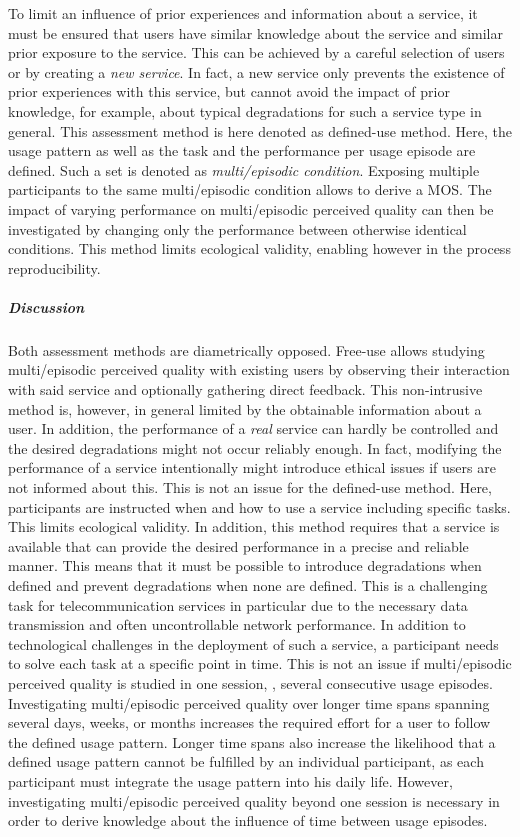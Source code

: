 To limit an influence of prior experiences and information about a service, it must be ensured that users have similar knowledge about the service and similar prior exposure to the service.
This can be achieved by a careful selection of users or by creating a \emph{new service}.
In fact, a new service only prevents the existence of prior experiences with this service, but cannot avoid the impact of prior knowledge, for example, about typical degradations for such a service type in general.
This assessment method is here denoted as defined-use method.
Here, the usage pattern as well as the task and the performance per usage episode are defined.
Such a set is denoted as \emph{multi\-/episodic condition}.
Exposing multiple participants to the same multi\-/episodic condition allows to derive a \ac{MOS}.
The impact of varying performance on multi\-/episodic perceived quality can then be investigated by changing only the performance between otherwise identical conditions.
This method limits ecological validity, enabling however in the process reproducibility.

\subparagraph*{Discussion}
Both assessment methods are diametrically opposed. 
Free-use allows studying multi\-/episodic perceived quality with existing users by observing their interaction with said service and optionally gathering direct feedback.
This non-intrusive method is, however, in general limited by the obtainable information about a user.
In addition, the performance of a \emph{real} service can hardly be controlled and the desired degradations might not occur reliably enough.
In fact, modifying the performance of a service intentionally might introduce ethical issues if users are not informed about this.
This is not an issue for the defined-use method.
Here, participants are instructed when and how to use a service including specific tasks.
This limits ecological validity.
In addition, this method requires that a service is available that can provide the desired performance in a precise and reliable manner.
This means that it must be possible to introduce degradations when defined and prevent degradations when none are defined.
This is a challenging task for telecommunication services in particular due to the necessary data transmission and often uncontrollable network performance.
In addition to technological challenges in the deployment of such a service, a participant needs to solve each task at a specific point in time.
This is not an issue if multi\-/episodic perceived quality is studied in one session, \eg, several consecutive usage episodes.
Investigating multi\-/episodic perceived quality over longer time spans spanning several days, weeks, or months increases the required effort for a user to follow the defined usage pattern.
Longer time spans also increase the likelihood that a defined usage pattern cannot be fulfilled by an individual participant, as each participant must integrate the usage pattern into his daily life.
However, investigating multi\-/episodic perceived quality beyond one session is necessary in order to derive knowledge about the influence of time between usage episodes.


